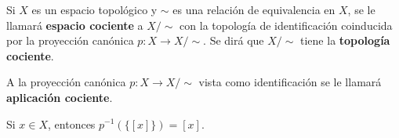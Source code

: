 

\begin{definition}
Si $X$ es un espacio topológico y $\sim$ es una relación de equivalencia en $X$, se le llamará \textbf{espacio cociente} a $X/\sim$ con la topología de identificación coinducida por la proyección canónica $p : X \longrightarrow X/\sim$. Se dirá que $X/\sim$ tiene la \textbf{topología cociente}.
\end{definition}

\begin{definition}
A la proyección canónica $p : X \longrightarrow X/\sim$ vista como identificación se le llamará \textbf{aplicación cociente}.
\end{definition}

\begin{remark}
Si $x \in X$, entonces $p^{-1}(\{ [ x ] \}) = [x]$.
\end{remark}
